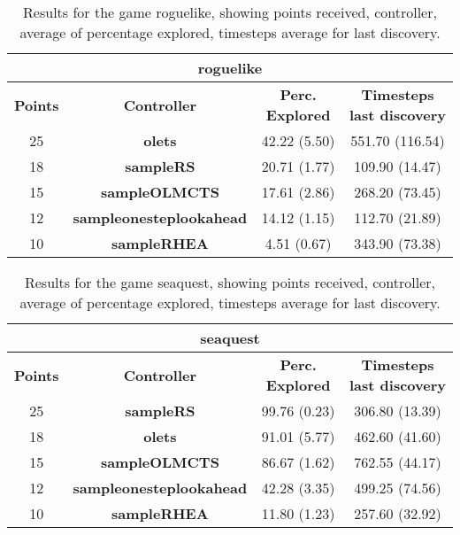 \begin{table*}[!t]
\begin{center}
\begin{tabular}{|c|c|c|c|}
\multicolumn{4}{c}{\textbf{roguelike}}\\
\hline
\textbf{Points} & \textbf{Controller} & \textbf{Perc. Explored} &  \textbf{Timesteps last discovery}\\
\hline
25 & \textbf{olets} & 42.22 (5.50) & 551.70 (116.54)
 \\
\hline
18 & \textbf{sampleRS} & 20.71 (1.77) & 109.90 (14.47)
 \\
\hline
15 & \textbf{sampleOLMCTS} & 17.61 (2.86) & 268.20 (73.45)
 \\
\hline
12 & \textbf{sampleonesteplookahead} & 14.12 (1.15) & 112.70 (21.89)
 \\
\hline
10 & \textbf{sampleRHEA} & 4.51 (0.67) & 343.90 (73.38)
 \\
\hline
\end{tabular}
\caption{Results for the game roguelike, showing points received, controller, average of percentage explored, timesteps average for last discovery.}
\label{tab:weights}
\end{center}
\end{table*}
\begin{table*}[!t]
\begin{center}
\begin{tabular}{|c|c|c|c|}
\multicolumn{4}{c}{\textbf{seaquest}}\\
\hline
\textbf{Points} & \textbf{Controller} & \textbf{Perc. Explored} &  \textbf{Timesteps last discovery}\\
\hline
25 & \textbf{sampleRS} & 99.76 (0.23) & 306.80 (13.39)
 \\
\hline
18 & \textbf{olets} & 91.01 (5.77) & 462.60 (41.60)
 \\
\hline
15 & \textbf{sampleOLMCTS} & 86.67 (1.62) & 762.55 (44.17)
 \\
\hline
12 & \textbf{sampleonesteplookahead} & 42.28 (3.35) & 499.25 (74.56)
 \\
\hline
10 & \textbf{sampleRHEA} & 11.80 (1.23) & 257.60 (32.92)
 \\
\hline
\end{tabular}
\caption{Results for the game seaquest, showing points received, controller, average of percentage explored, timesteps average for last discovery.}
\label{tab:weights}
\end{center}
\end{table*}
